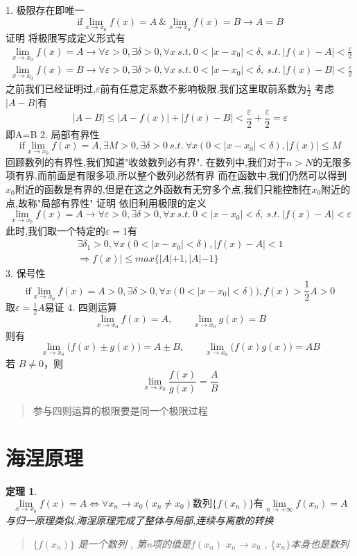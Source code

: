 \documentclass[UTF8,11pt]{ctexart}
\theoremstyle{cnthm}
\newtheorem{thm}{定理}[section]
\begin{document}
1. 极限存在即唯一
$$
\text{if} \lim\limits_{x \to x_0}f(x) = A \  \text{\&} \lim\limits_{x \to x_0}f(x) = B \to A=B
$$
证明
将极限写成定义形式有
$$\begin{aligned}
\lim\limits_{x \to x_0}f(x) = A \to \forall \varepsilon > 0 , \exists \delta > 0 , \forall x \ s.t. \ 0<|x-x_0|< \delta , \ s.t. \ |f(x)-A|< \frac{\varepsilon}{2} \\
\lim\limits_{x \to x_0}f(x) = B \to \forall \varepsilon > 0 , \exists \delta > 0 , \forall x \ s.t. \ 0<|x-x_0|< \delta , \ s.t. \ |f(x)-B|< \frac{\varepsilon}{2}
\end{aligned}
$$
之前我们已经证明过,$\varepsilon$前有任意定系数不影响极限,我们这里取前系数为$\frac{1}{2}$
考虑$|A-B|$有
$$
|A-B| \leq |A-f(x)|+|f(x)-B| < \frac{\varepsilon}{2}+\frac{\varepsilon}{2} = \varepsilon
$$
即A=B
2. 局部有界性
$$
\text{if} \lim\limits_{x \to x_0}f(x) = A , \exists M > 0 , \exists \delta > 0 \ s.t. \ \forall x (0<|x-x_0|< \delta) , |f(x)| \leq M
$$
回顾数列的有界性,我们知道"收敛数列必有界". 在数列中,我们对于$n>N$的无限多项有界,而前面是有限多项,所以整个数列必然有界
而在函数中,我们仍然可以得到$x_0$附近的函数是有界的,但是在这之外函数有无穷多个点,我们只能控制在$x_0$附近的点,故称"局部有界性"
证明
依旧利用极限的定义
$$
\lim\limits_{x \to x_0}f(x) = A \to \forall \varepsilon > 0 , \exists \delta > 0 , \forall x \ s.t. \ 0<|x-x_0|< \delta , \ s.t. \ |f(x)-A|< \varepsilon
$$
此时,我们取一个特定的$\varepsilon = 1$有
$$\begin{aligned}
\exists \delta_{1} > 0 , \forall x (0<|x-x_0|<\delta) , |f(x)-A|<1 \\
\Rightarrow f(x)| \leq max \{ |A|+1 , |A|-1 \}
\end{aligned}
$$
3. 保号性
$$
\text{if} \lim\limits_{x \to x_0}f(x) = A > 0 , \exists \delta > 0 , \forall x (0<|x-x_0|<\delta)) , f(x) > \frac{1}{2}A > 0
$$
取$\varepsilon = \frac{1}{2} A$易证
4. 四则运算
$$
\lim\limits_{x\to x_0}f(x)=A,\qquad
\lim\limits_{x\to x_0}g(x)=B
$$
则有
$$
\lim\limits_{x\to x_0}\bigl(f(x)\pm g(x)\bigr)=A\pm B,
\qquad
\lim\limits_{x\to x_0}\bigl(f(x)g(x)\bigr)=AB
$$
若 $B\neq0$，则
$$
\lim\limits_{x\to x_0}\frac{f(x)}{g(x)}
=\frac{A}{B}
$$
\begin{quote}
参与四则运算的极限要是同一个极限过程
\end{quote}


\section{海涅原理}

\begin{thm}
$$
\lim\limits_{x \to x_0}f(x) = A
\Leftrightarrow
\forall x_n \to x_0 (x_n \neq x_0)
\text{数列}\{ f(x_n) \}\text{有}
\lim\limits_{n \to +\infty}f(x_n) = A
$$
与归一原理类似,海涅原理完成了整体与局部,连续与离散的转换
\begin{quote}
$\{ f(x_n) \}$ 是一个数列 , 第n项的值是$f(x_n)$
$x_n \to x_0$ , $\{ x_n \}$本身也是数列
\end{quote}
\end{thm}
\end{document}
